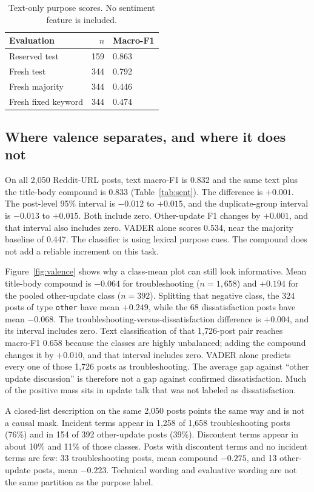 \documentclass[conference,letterpaper]{IEEEtran}
\begin{document}
\begin{table}[t]
\caption{Text-only purpose scores. No sentiment feature is included.}
\label{tab:purpose}
\centering
\footnotesize
\begin{tabular}{lrl}
\toprule
Evaluation & $n$ & Macro-F1 \\
\midrule
Reserved test & 159 & 0.863 \\
Fresh test & 344 & 0.792 \\
Fresh majority & 344 & 0.446 \\
Fresh fixed keyword & 344 & 0.474 \\
\bottomrule
\end{tabular}
\end{table}

\subsection{Where valence separates, and where it does not}
On all 2,050 Reddit-URL posts, text macro-F1 is 0.832 and the same text plus the title-body compound is 0.833 (Table~\ref{tab:sent}). The difference is $+0.001$. The post-level 95\% interval is $-0.012$ to $+0.015$, and the duplicate-group interval is $-0.013$ to $+0.015$. Both include zero. Other-update F1 changes by $+0.001$, and that interval also includes zero. VADER alone scores 0.534, near the majority baseline of 0.447. The classifier is using lexical purpose cues. The compound does not add a reliable increment on this task.

Figure~\ref{fig:valence} shows why a class-mean plot can still look informative. Mean title-body compound is $-0.064$ for troubleshooting ($n=1{,}658$) and $+0.194$ for the pooled other-update class ($n=392$). Splitting that negative class, the 324 posts of type \texttt{other} have mean $+0.249$, while the 68 dissatisfaction posts have mean $-0.068$. The troubleshooting-versus-dissatisfaction difference is $+0.004$, and its interval includes zero. Text classification of that 1,726-post pair reaches macro-F1 0.658 because the classes are highly unbalanced; adding the compound changes it by $+0.010$, and that interval includes zero. VADER alone predicts every one of those 1,726 posts as troubleshooting. The average gap against ``other update discussion'' is therefore not a gap against confirmed dissatisfaction. Much of the positive mass sits in update talk that was not labeled as dissatisfaction.

A closed-list description on the same 2,050 posts points the same way and is not a causal mask. Incident terms appear in 1,258 of 1,658 troubleshooting posts (76\%) and in 154 of 392 other-update posts (39\%). Discontent terms appear in about 10\% and 11\% of those classes. Posts with discontent terms and no incident terms are few: 33 troubleshooting posts, mean compound $-0.275$, and 13 other-update posts, mean $-0.223$. Technical wording and evaluative wording are not the same partition as the purpose label.
\end{document}
